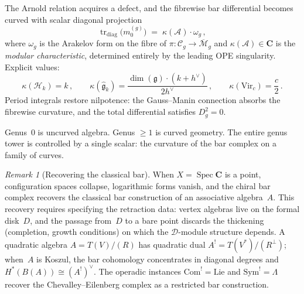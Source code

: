 \documentclass[11pt,reqno]{amsart}
\theoremstyle{definition}
\theoremstyle{remark}
\newtheorem{remark}[theorem]{Remark}
\newcommand{\cA}{\mathcal{A}}
\newcommand{\cH}{\mathcal{H}}
\newcommand{\cM}{\mathcal{M}}
\newcommand{\fg}{\mathfrak{g}}
\newcommand{\Sym}{\mathrm{Sym}}
\newcommand{\Spec}{\operatorname{Spec}}
\newcommand{\Vir}{\mathrm{Vir}}
\renewcommand{\Bbbk}{\mathbf{C}}
\numberwithin{equation}{section}
\begin{document}
The Arnold relation acquires a defect, and the fibrewise bar
differential becomes curved with scalar diagonal projection
\begin{equation}\label{eq:curvature}
\operatorname{tr}_{\mathrm{diag}}\!\bigl(m_0^{(g)}\bigr)
\;=\;
\kappa(\cA) \cdot \omega_g\,,
\end{equation}
where $\omega_g$ is the Arakelov form on the fibre of
$\pi \colon \mathcal{C}_g \to \overline{\cM}_g$ and
$\kappa(\cA) \in \Bbbk$ is the \emph{modular
characteristic}, determined entirely by the leading OPE
singularity. Explicit values:
\begin{equation}\label{eq:kappa-values}
\kappa(\cH_k) = k\,,
\qquad
\kappa(\widehat{\fg}_k)
= \frac{\dim(\fg) \cdot (k + h^\vee)}{2h^\vee}\,,
\qquad
\kappa(\Vir_c)
= \frac{c}{2}\,.
\end{equation}
Period integrals restore nilpotence: the Gauss--Manin
connection absorbs the fibrewise curvature, and the total
differential satisfies $D_g^2 = 0$.

Genus~$0$ is uncurved algebra. Genus $\ge 1$ is curved
geometry. The entire genus tower is controlled by a single
scalar: the curvature of the bar complex on a family of
curves.

\begin{remark}[Recovering the classical bar]
\label{rem:classical}
When $X = \Spec\Bbbk$ is a point, configuration spaces
collapse, logarithmic forms vanish, and the chiral bar complex
recovers the classical bar construction of an associative
algebra~$A$. This recovery requires specifying the retraction
data: vertex algebras live on the formal disk~$D$, and the
passage from~$D$ to a bare point discards the thickening
(completion, growth conditions) on which the
$\mathcal{D}$-module structure depends.
A quadratic algebra $A = T(V)/(R)$ has quadratic
dual $A^! = T(V^*)/(R^\perp)$; when~$A$ is Koszul, the bar
cohomology concentrates in diagonal degrees and
$H^*(B(A)) \cong (A^!)^\vee$. The operadic instances
$\mathrm{Com}^! = \mathrm{Lie}$ and
$\Sym^! = \Lambda$ recover the Chevalley--Eilenberg complex
as a restricted bar construction.
\end{remark}


\end{document}
